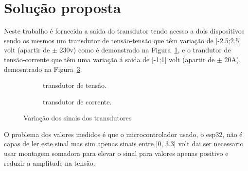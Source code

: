 \documentclass[12pt]{article}
\begin{document}
    \section{Solução proposta}
    Neste trabalho é fornecida a saida do transdutor tendo acesso a dois dispositivos sendo os mesmos um transdutor de tensão-tensão
que têm variação de [-2.5;2.5] volt (apartir de \(\pm\) 230v) como é demonstrado na Figura~\ref{fig:transdutor_tensão}, 
e o trandutor de tensão-corrente que têm uma variação á saida de [-1;1] volt (apartir de \(\pm\) 20A), demosntrado na Figura~\ref{fig:transdutor_corrente}.
\vspace*{1cm}
\begin{figure}[H]
    \centering
    \begin{subfigure}[b]{0.5\textwidth}
        \caption{transdutor de tensão.}
        \label{fig:transdutor_tensão}
    \end{subfigure}%
    \begin{subfigure}[b]{0.5\textwidth}
        \caption{transdutor de corrente.}
        \label{fig:transdutor_corrente}
    \end{subfigure}%
    \caption{Variação dos sinais dos transdutores}
\end{figure}


\noindent O problema dos valores medidos é que o microcontrolador usado, o esp32, não é capas de ler este sinal
mas sim apenas sinais entre [0, 3.3] volt dai ser necessario usar montagem somadora para elevar o sinal para valores 
apenas positivo e reduzir a amplitude na tensão.
\end{document}
